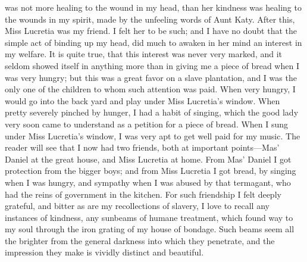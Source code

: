 was not more healing to the wound in my head, than her kindness was
healing to the wounds in my spirit, made by the unfeeling words of Aunt
Katy. After this, Miss Lucretia was my friend. I felt her to be such;
and I have no doubt that the simple act of binding up my head, did much
to awaken in her mind an interest in my welfare. It is quite true, that
this interest was never very marked, and it seldom showed itself in
anything more than in giving me a piece of bread when I was very hungry;
but this was a great favor on a slave plantation, and I was the only one
of the children to whom such attention was paid. When very hungry, I
would go into the back yard and play under Miss Lucretia's window. When
pretty severely pinched by hunger, I had a habit of singing, which the
good lady very soon came to understand as a petition for a piece of
bread. When I sung under Miss Lucretia's window, I was very apt to get
well paid for my music. The reader will see that I now had two friends,
both at important points---Mas' Daniel at the great house, and Miss
Lucretia at home. From Mas' Daniel I got protection from the bigger
boys; and from Miss Lucretia I got bread, by singing when I was hungry,
and sympathy when I was abused by that termagant, who had the reins of
government in the kitchen. For such friendship I felt deeply grateful,
and bitter as are my recollections of slavery, I love to recall any
instances of kindness, any sunbeams of humane treatment, which found way
to my soul through the iron grating of my house of bondage. Such beams
seem all the brighter from {\protect\hypertarget{132}{}{}}the general
darkness into which they penetrate, and the impression they make is
vividly distinct and beautiful.

